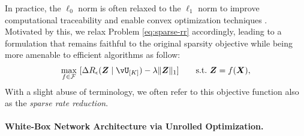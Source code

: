 \documentclass[../../book-main.tex]{subfiles}
\begin{document}

In practice, the $\ell_0$ norm is often relaxed to the $\ell_1$ norm to improve computational traceability and enable convex optimization techniques \cite{Wright-Ma-2022}. Motivated by this, we relax Problem \eqref{eq:sparse-rr} accordingly, leading to a formulation that remains faithful to the original sparsity objective while being more amenable to efficient algorithms as follow:  
\begin{equation}
\begin{aligned}
   \max_{f \in \mathcal{F}}\ [\Delta R_{\epsilon}(\Z \mid \vU_{[K]}) - \lambda \|\bm{Z}\|_1]  \qquad \text{s.t.}\ \Z = f(\X),
   \label{eq:sparse-rr-1}
\end{aligned}
\end{equation}
 With a slight abuse of terminology, we often refer to this objective function also as the \textit{sparse rate reduction}. 

\paragraph{White-Box Network Architecture via Unrolled Optimization.} 

\end{document}
